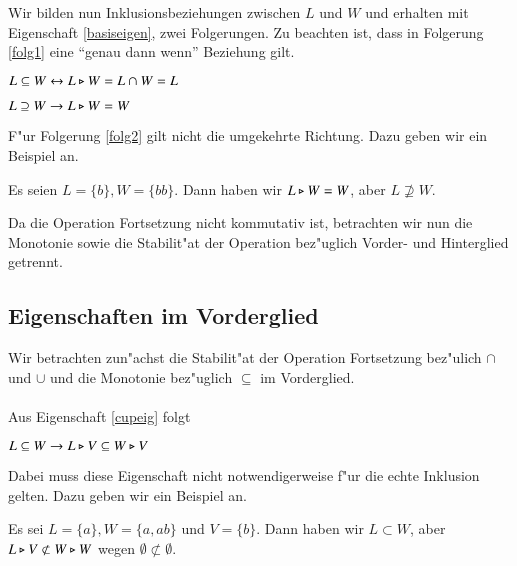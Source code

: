 Wir bilden nun Inklusionsbeziehungen zwischen $L$ und $W$ und erhalten mit Eigenschaft \ref{basiseigen}, zwei Folgerungen.
Zu beachten ist, dass in Folgerung \ref{folg1} eine "`genau dann wenn"' Beziehung gilt.

\vspace{2ex}

\begin{folg}\label{folg1}
$L\subseteq W \leftrightarrow L\triangleright W = L\cap W = L$
\end{folg}

\vspace{2ex}

\begin{folg}\label{folg2}
$L\supseteq W \to L\triangleright W = W$
\end{folg}
F"ur Folgerung \ref{folg2} gilt nicht die umgekehrte Richtung. Dazu geben wir ein Beispiel an.

\vspace{2ex}

\begin{beispiel}
Es seien $L=\{b\}, W=\{bb\}$. Dann haben wir $L\triangleright W = W$, aber $L\not\supseteq W$.
\end{beispiel}

Da die Operation Fortsetzung nicht kommutativ ist, betrachten wir nun die Monotonie sowie die Stabilit"at der Operation bez"uglich Vorder- und Hinterglied getrennt.
\subsection{Eigenschaften im Vorderglied}

Wir betrachten zun"achst die Stabilit"at der Operation Fortsetzung bez"ulich $\cap$ und $\cup$ und die Monotonie bez"uglich $\subseteq$ im Vorderglied.\\\\
Aus Eigenschaft \ref{cupeig} folgt

\vspace{2ex}

\begin{eigen}\label{fresh}
$L\subseteq W \to L\triangleright V \subseteq W \triangleright V$
\end{eigen}
Dabei muss diese Eigenschaft nicht notwendigerweise f"ur die echte Inklusion gelten. Dazu geben wir ein Beispiel an.

\vspace{2ex}

\begin{beispiel}
Es sei $L=\{a\}, W=\{a,ab\}$ und $V=\{b\}$. Dann haben wir $L\subset W$, aber $L\triangleright V \not\subset W\triangleright W$ wegen $\emptyset \not\subset\emptyset$.
\end{beispiel}

